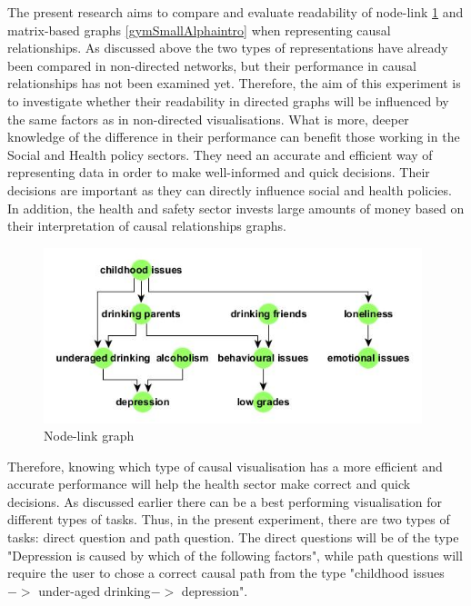 \documentclass{l4proj}
\begin{document}
The present research aims to compare and evaluate readability of node-link \ref{drinkingIssuesSmallHierIntro} and matrix-based graphs \ref{gymSmallAlphaintro} when representing causal relationships. As discussed above the two types of representations have already been compared in non-directed networks, but their performance in causal relationships has not been examined yet. Therefore, the aim of this experiment is to investigate whether their readability in directed graphs will be influenced by the same factors as in non-directed visualisations. What is more, deeper knowledge of the difference in their performance can benefit those working in the Social and Health policy sectors. They need an accurate and efficient way of representing data in order to make well-informed and quick decisions. Their decisions are important as they can directly influence social and health policies. In addition, the health and safety sector invests large amounts of money based on their interpretation of causal relationships graphs.


\begin{figure}[H]
\centering
\includegraphics[width=11cm]{images/drinkingIssuesSmallHier.jpg}
\caption{Node-link graph}
\label{drinkingIssuesSmallHierIntro}
\end{figure}

Therefore, knowing which type of causal visualisation has a more efficient and accurate performance will help the health sector make correct and quick decisions. As discussed earlier there can be a best performing visualisation for different types of tasks. Thus, in the present experiment, there are two types of tasks: direct question and path question. The direct questions will be of the type "Depression is caused by which of the following factors", while path questions will require the user to chose a correct causal path from the type "childhood issues $->$ under-aged drinking$->$ depression". 
\end{document}
